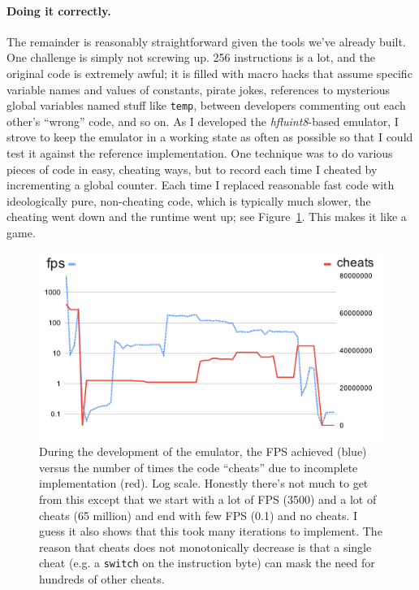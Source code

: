 \documentclass[twocolumn]{article}
\begin{document}
\paragraph{Doing it correctly.}
The remainder is reasonably straightforward given the tools we've already
built. One challenge is simply not screwing up. 256 instructions is a lot,
and the original code is extremely awful; it is filled with macro hacks
that assume specific variable names and values of constants, pirate jokes,
references to mysterious global variables named stuff like {\tt temp},
between developers commenting out each other's ``wrong'' code, and so on.
As I developed the {\it hfluint8}-based emulator, I strove to keep the
emulator in a working state as often as possible so that I could test it
against the reference implementation. One technique was to do various
pieces of code in easy, cheating ways, but to record each time I cheated
by incrementing a global counter. Each time I replaced reasonable fast
code with ideologically pure, non-cheating code, which is typically much slower,
the cheating went down and the runtime went up; see Figure~\ref{fig:cheating}.
This makes it like a game.

\begin{figure}[htp]
  \includegraphics[width=0.95 \linewidth]{fpscheats}
  \caption{
    During the development of the emulator, the FPS achieved (blue) versus
    the number of times the code ``cheats'' due to incomplete implementation (red).
    Log scale. Honestly there's not much to get from this except that we start
    with a lot of FPS (3500) and a lot of cheats (65 million) and end with
    few FPS (0.1) and no cheats. I guess it also shows that this took many
    iterations to implement. The reason that cheats does not monotonically
    decrease is that a single cheat (e.g. a {\tt switch} on the instruction byte)
    can mask the need for hundreds of other cheats.
  } \label{fig:cheating}
\end{figure}
\end{document}
